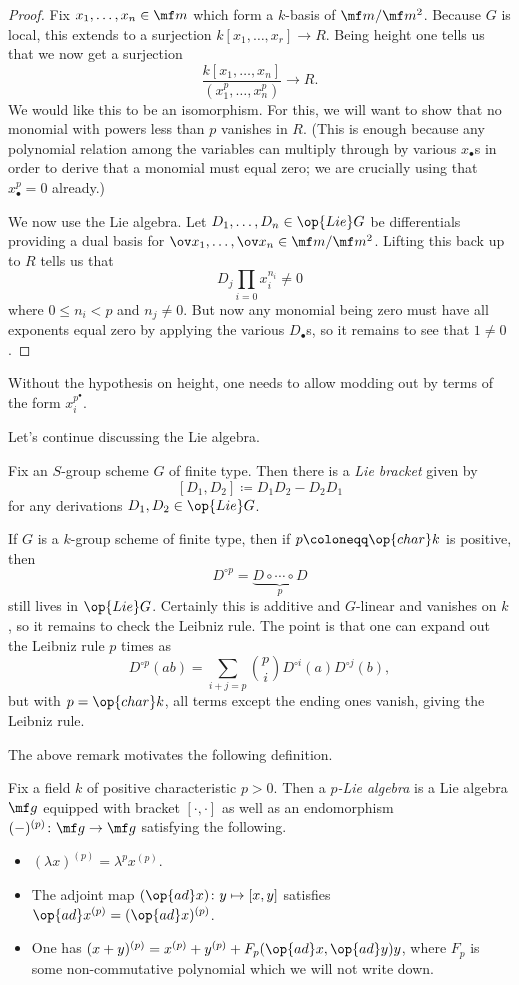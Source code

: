 \documentclass[../notes.tex]{subfiles}
\begin{document}
\begin{proof}
	Fix $x_1,\ldots,x_n\in\mf m$ which form a $k$-basis of $\mf m/\mf m^2$. Because $G$ is local, this extends to a surjection $k[x_1,\ldots,x_r]\to R$. Being height one tells us that we now get a surjection
	\[\frac{k[x_1,\ldots,x_n]}{\left(x_1^p,\ldots,x_n^p\right)}\to R.\]
	We would like this to be an isomorphism. For this, we will want to show that no monomial with powers less than $p$ vanishes in $R$. (This is enough because any polynomial relation among the variables can multiply through by various $x_\bullet$s in order to derive that a monomial must equal zero; we are crucially using that $x_\bullet^p=0$ already.)

	We now use the Lie algebra. Let $D_1,\ldots,D_n\in\op{Lie}G$ be differentials providing a dual basis for $\ov x_1,\ldots,\ov x_n\in\mf m/\mf m^2$. Lifting this back up to $R$ tells us that
	\[D_j\prod_{i=0}x_i^{n_i}\ne0\]
	where $0\le n_i<p$ and $n_j\ne0$. But now any monomial being zero must have all exponents equal zero by applying the various $D_\bullet$s, so it remains to see that $1\ne0$.
\end{proof}
\begin{remark}
	Without the hypothesis on height, one needs to allow modding out by terms of the form $x_i^{p^\bullet}$.
\end{remark}
Let's continue discussing the Lie algebra.
\begin{definition}
	Fix an $S$-group scheme $G$ of finite type. Then there is a \textit{Lie bracket} given by
	\[[D_1,D_2]\coloneqq D_1D_2-D_2D_1\]
	for any derivations $D_1,D_2\in\op{Lie}G$.
\end{definition}
\begin{remark}
	If $G$ is a $k$-group scheme of finite type, then if $p\coloneqq\op{char}k$ is positive, then
	\[D^{\circ p}=\underbrace{D\circ\cdots\circ D}_p\]
	still lives in $\op{Lie}G$. Certainly this is additive and $G$-linear and vanishes on $k$, so it remains to check the Leibniz rule. The point is that one can expand out the Leibniz rule $p$ times as
	\[D^{\circ p}(ab)=\sum_{i+j=p}\binom piD^{\circ i}(a)D^{\circ j}(b),\]
	but with $p=\op{char}k$, all terms except the ending ones vanish, giving the Leibniz rule.
\end{remark}
The above remark motivates the following definition.
\begin{definition}
	Fix a field $k$ of positive characteristic $p>0$. Then a \textit{$p$-Lie algebra} is a Lie algebra $\mf g$ equipped with bracket $[\cdot,\cdot]$ as well as an endomorphism $(-)^{(p)}\colon\mf g\to\mf g$ satisfying the following.
	\begin{itemize}
		\item $(\lambda x)^{(p)}=\lambda^px^{(p)}$.
		\item The adjoint map $(\op{ad}x)\colon y\mapsto[x,y]$ satisfies $\op{ad}x^{(p)}=(\op{ad}x)^{(p)}$.
		\item One has $(x+y)^{(p)}=x^{(p)}+y^{(p)}+F_p(\op{ad}x,\op{ad}y)y$, where $F_p$ is some non-commutative polynomial which we will not write down.
	\end{itemize}
\end{definition}
\end{document}
